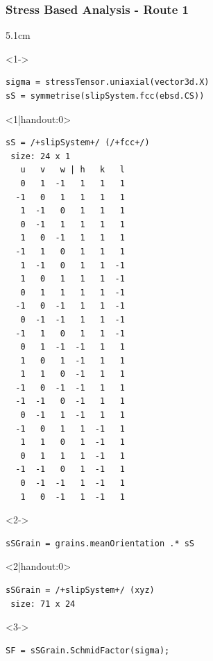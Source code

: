 \documentclass[compress,aspectratio=1610,fleqn]{beamer}
\begin{document}
  \begin{frame}[fragile]
  \frametitle{Stress Based Analysis - Route 1}
  \vspace{-0.7cm}
  \begin{overlayarea}{\textwidth}{5.1cm}
    \begin{onlyenv}<1->
      \begin{lstlisting}[style=input]
sigma = stressTensor.uniaxial(vector3d.X)
sS = symmetrise(slipSystem.fcc(ebsd.CS))
\end{lstlisting}
  \end{onlyenv}
  \begin{onlyenv}<1|handout:0>
    \vspace{-0.3cm}
    \begin{lstlisting}[style=output]
sS = /+slipSystem+/ (/+fcc+/)
 size: 24 x 1
   u   v   w | h   k   l
   0   1  -1   1   1   1
  -1   0   1   1   1   1
   1  -1   0   1   1   1
   0  -1   1   1   1   1
   1   0  -1   1   1   1
  -1   1   0   1   1   1
   1  -1   0   1   1  -1
   1   0   1   1   1  -1
   0   1   1   1   1  -1
  -1   0  -1   1   1  -1
   0  -1  -1   1   1  -1
  -1   1   0   1   1  -1
   0   1  -1  -1   1   1
   1   0   1  -1   1   1
   1   1   0  -1   1   1
  -1   0  -1  -1   1   1
  -1  -1   0  -1   1   1
   0  -1   1  -1   1   1
  -1   0   1   1  -1   1
   1   1   0   1  -1   1
   0   1   1   1  -1   1
  -1  -1   0   1  -1   1
   0  -1  -1   1  -1   1
   1   0  -1   1  -1   1
\end{lstlisting}
    \end{onlyenv}
    \vspace{-0.35cm}
    \begin{onlyenv}<2->
      \begin{lstlisting}[style=input]
sSGrain = grains.meanOrientation .* sS
\end{lstlisting}
    \end{onlyenv}
    \begin{onlyenv}<2|handout:0>
      \vspace{-0.35cm}
      \begin{lstlisting}[style=output]
sSGrain = /+slipSystem+/ (xyz)
 size: 71 x 24
\end{lstlisting}
    \end{onlyenv}
    \begin{onlyenv}<3->
      \vspace{-0.35cm}
      \begin{lstlisting}[style=input]
SF = sSGrain.SchmidFactor(sigma);
\end{lstlisting}

\end{onlyenv}
\end{overlayarea}
\end{frame}
\end{document}
